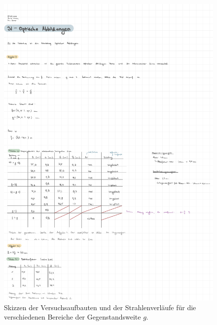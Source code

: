 \onecolumn
\begin{figure}[h!]
    \centering
    \includegraphics[width=\textwidth, page=4]{Protokolle/31/Chapter/Messprotokoll.pdf}
    \caption{Skizzen der Versuchsaufbauten und der Strahlenverläufe für die verschiedenen Bereiche der Gegenstandsweite $g$.}
    \label{fig:auswertung_achromat1}
\end{figure}


